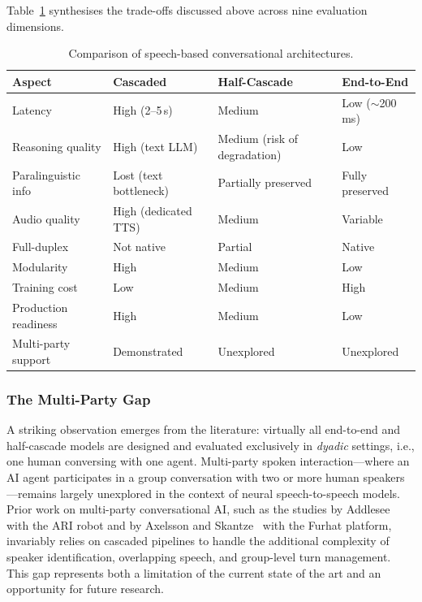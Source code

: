Table~\ref{tab:arch-comparison} synthesises the trade-offs discussed above
across nine evaluation dimensions.

\begin{table}[ht]
  \centering
  \caption{Comparison of speech-based conversational architectures.}
  \label{tab:arch-comparison}
  \small
  \begin{tabularx}{\textwidth}{@{} l >{\centering\arraybackslash}X >{\centering\arraybackslash}X >{\centering\arraybackslash}X @{}}
    \toprule
    \textbf{Aspect} & \textbf{Cascaded} & \textbf{Half-Cascade} & \textbf{End-to-End} \\
    \midrule
    Latency
      & High (2--5\,s)
      & Medium
      & Low (${\sim}$200\,ms) \\
    Reasoning quality
      & High (text LLM)
      & Medium (risk of degradation)
      & Low~\cite{chen2025urobench} \\
    Paralinguistic info
      & Lost (text bottleneck)
      & Partially preserved
      & Fully preserved \\
    Audio quality
      & High (dedicated TTS)
      & Medium
      & Variable \\
    Full-duplex
      & Not native
      & Partial
      & Native \\
    Modularity
      & High
      & Medium
      & Low \\
    Training cost
      & Low
      & Medium
      & High \\
    Production readiness
      & High
      & Medium
      & Low~\cite{lin2025xtalk} \\
    Multi-party support
      & Demonstrated
      & Unexplored
      & Unexplored \\
    \bottomrule
  \end{tabularx}
\end{table}

\subsubsection{The Multi-Party Gap}
\label{sssec:multiparty-gap}

A striking observation emerges from the literature: virtually all end-to-end and
half-cascade models are designed and evaluated exclusively in \emph{dyadic}
settings, i.e., one human conversing with one agent.  Multi-party spoken
interaction---where an AI agent participates in a group conversation with two or
more human speakers---remains largely unexplored in the context of neural
speech-to-speech models.  Prior work on multi-party conversational AI, such as
the studies by Addlesee~\cite{addlesee2024ari} with the ARI robot and by
Axelsson and Skantze~\cite{axelsson2025furhat} with the Furhat platform,
invariably relies on cascaded pipelines to handle the additional complexity of
speaker identification, overlapping speech, and group-level turn management.
This gap represents both a limitation of the current state of the art and an
opportunity for future research.

